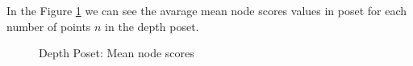\documentclass{article}
\begin{document}
\par In the Figure \ref{fig:scores_node_mean} we can see the avarage mean node scores values in poset for each number of points $n$ in the depth poset.
\begin{figure}[ht]
  \vspace{-96pt}
  \centering
  \hspace*{-0.19\textwidth}
  \caption{Depth Poset: Mean node scores}
  \label{fig:scores_node_mean}
\end{figure}
\end{document}
